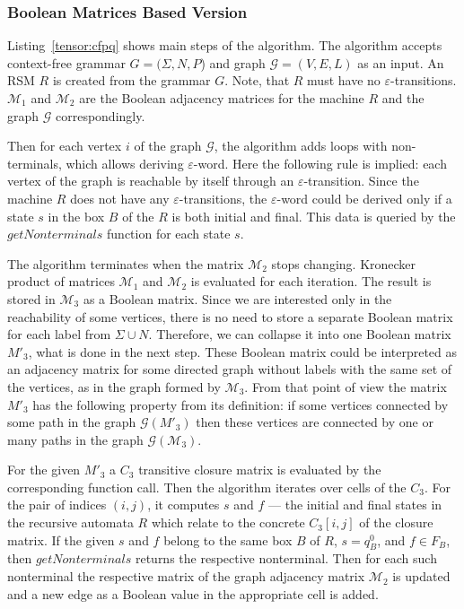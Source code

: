 
\subsubsection{Boolean Matrices Based Version}
Listing~\ref{tensor:cfpq} shows main steps of the algorithm.
The algorithm accepts context-free grammar $G=(\Sigma,N,P$) and graph $\mathcal{G}=(V,E,L)$ as an input.
An RSM $R$ is created from the grammar $G$.
Note, that $R$ must have no $\varepsilon$-transitions.
$\mathcal{M}_1$ and $\mathcal{M}_2$ are the Boolean adjacency matrices for the machine 
$R$ and the graph $\mathcal{G}$ correspondingly.

Then for each vertex $i$ of the graph $\mathcal{G}$, the algorithm adds loops 
with non-terminals, which allows deriving $\varepsilon$-word.
Here the following rule is implied: each vertex of the graph is reachable 
by itself through an $\varepsilon$-transition. Since the machine $R$ does 
not have any $\varepsilon$-transitions, the $\varepsilon$-word could be 
derived only if a state $s$ in the box $B$ of the $R$ is both initial and final.
This data is queried by the $getNonterminals$ function for each state $s$.

The algorithm terminates when the matrix $\mathcal{M}_2$ stops changing.
Kronecker product of matrices $\mathcal{M}_1$ and $\mathcal{M}_2$ is evaluated
for each iteration.
The result is stored in $\mathcal{M}_3$ as a Boolean matrix. Since we are interested
only in the reachability of some vertices, there is no need to store a separate
Boolean matrix for each label from $\Sigma \cup N$. Therefore, we can 
collapse it into one Boolean matrix $M'_3$, what is done in the next step.
These Boolean matrix could be interpreted as an adjacency matrix for some directed graph
without labels with the same set of the vertices, as in the graph formed by $\mathcal{M}_3$.
From that point of view the matrix $M'_3$ has the following property 
from its definition: if some vertices connected by some path in the graph $\mathcal{G}(M'_3)$ then these vertices are
connected by one or many paths in the graph $\mathcal{G}(\mathcal{M}_3)$.

For the given $M'_3$ a $C_3$ transitive closure matrix
is evaluated by the corresponding function call. 
Then the algorithm iterates over cells of the $C_3$.
For the pair of indices $(i,j)$, it computes $s$ and $f$ --- 
the initial and final states in the recursive automata $R$ which relate 
to the concrete $C_3[i,j]$ of the closure matrix.
If the given $s$ and $f$ belong to the same box $B$ of $R$, $s = q_B^0$, 
and $f \in F_B$, then $getNonterminals$ returns the respective nonterminal.
Then for each such nonterminal the respective matrix of the graph adjacency 
matrix $\mathcal{M}_2$ is updated and a new edge as a Boolean value in the 
appropriate cell is added.

